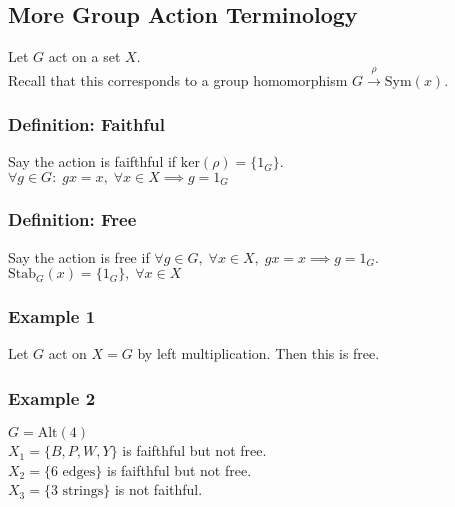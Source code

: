 \documentclass[11pt]{article}
\newcommand{\0}{\emptyset}
\begin{document}
\subsection*{More Group Action Terminology}
\label{sec:org5a01901}
Let \(G\) act on a set \(X\).\\[0pt]
Recall that this corresponds to a group homomorphism \(G\overset{\rho}{\to}\text{Sym}(x)\).\\[0pt]
\subsubsection*{Definition: Faithful}
\label{sec:org170d2f7}
Say the action is faifthful if \(\text{ker}(\rho)=\{1_{G}\}\).\\[0pt]
\(\forall g\in G:\;gx=x,\;\forall x\in X\implies g=1_{G}\)\\[0pt]
\subsubsection*{Definition: Free}
\label{sec:org4719327}
Say the action is free if \(\forall g\in G,\;\forall x\in X,\;gx=x\implies g=1_{G}\).\\[0pt]
\(\text{Stab}_{G}(x)=\{1_{G}\},\;\forall x\in X\)\\[0pt]
\subsubsection*{Example 1}
\label{sec:org7dace8e}
Let \(G\) act on \(X=G\) by left multiplication. Then this is free.\\[0pt]
\subsubsection*{Example 2}
\label{sec:orgfb406e1}
\(G=\text{Alt}(4)\)\\[0pt]
\(X_{1}=\{B,P,W,Y\}\) is faifthful but not free.\\[0pt]
\(X_{2}=\{\text{6 edges}\}\) is faifthful but not free.\\[0pt]
\(X_{3}=\{\text{3 strings}\}\) is not faithful.\\[0pt]
\end{document}
